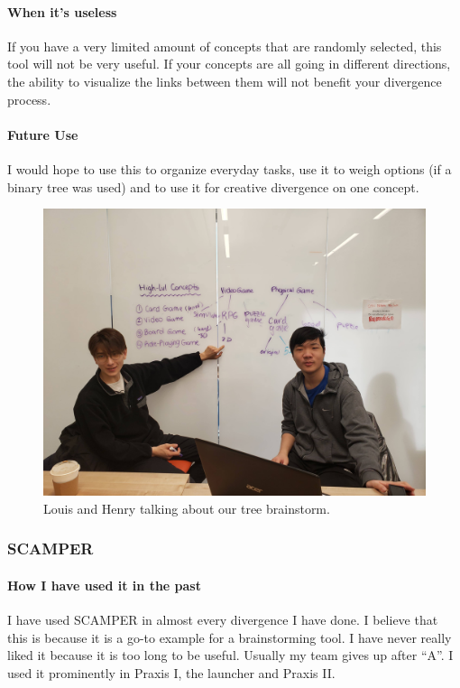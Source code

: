 \documentclass[paper=a4, fontsize=11pt]{article} %
\newcommand{\raisetarget}[2]%
{\bgroup
  \sbox0{#2}%
  \raisebox{\ht0}{\hypertarget{#1}{}}\usebox0%
\egroup}
\begin{document}
                    \paragraph{When it's useless} If you have a very limited amount of concepts that are randomly selected, this tool will not be very useful. If your concepts are all going in different directions, the ability to visualize the links between them will not benefit your divergence process. 
                    \paragraph{Future Use} I would hope to use this to organize everyday tasks, use it to weigh options (if a binary tree was used) and to use it for creative divergence on one concept. 
                    \begin{figure}[H]
                        \centering
	                    \includegraphics[width=0.6\linewidth]{tree.jpg}
	                    \caption{Louis and Henry talking about our tree brainstorm.}
                    \end{figure}
        \raisetarget{scamplink}{}
        \subsubsection{SCAMPER}
            \paragraph{How I have used it in the past}
             \cite{scamp} I have used SCAMPER in almost every divergence I have done. I believe that this is because it is a go-to example for a brainstorming tool. I have never really liked it because it is too long to be useful. Usually my team gives up after ``A''. I used it prominently in Praxis I, the launcher and Praxis II. 
\end{document}
